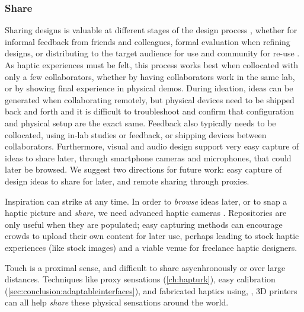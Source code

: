 \subsubsection{Share} 
Sharing designs is valuable at different stages of the design process \cite{Kulkarni2014}, whether for informal feedback from friends and colleagues, formal evaluation when refining designs, or distributing to the target audience for use and community for re-use \cite{Shneiderman2007}.
As haptic experiences must be felt, this process works best when collocated with only a few collaborators, whether by having collaborators work in the same lab, or by showing final experience in physical demos.
During ideation, ideas can be generated when collaborating remotely, but physical devices need to be shipped back and forth and it is difficult to troubleshoot and confirm that configuration and physical setup are the exact same.
Feedback also typically needs to be collocated, using in-lab studies or feedback, or shipping devices between collaborators.
Furthermore, visual and audio design support very easy capture of ideas to share later, through smartphone cameras and microphones, that could later be browsed.
We suggest two  directions for future work: easy capture of design ideas to share for later, and remote sharing through proxies.

Inspiration can strike at any time.
In order to \emph{browse} ideas later, or to snap a haptic picture and \emph{share}, we need advanced haptic cameras \cite{MacLean1996}.
Repositories are only useful when they are populated; easy capturing methods can encourage crowds to upload their own content for later use, perhaps leading to stock haptic experiences (like stock images) and a viable venue for freelance haptic designers.

Touch is a proximal sense, and difficult to share asycnhronously or over large distances.
Techniques like proxy sensations (\autoref{ch:hapturk}), easy calibration (\autoref{sec:conclusion:adaptableinterfaces}), and fabricated haptics using, \eg, 3D printers \cite{torres2015hapticprint} can all help \emph{share} these physical sensations around the world.


